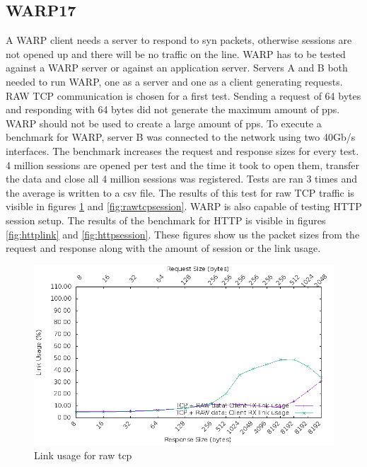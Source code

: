 \newpage

\subsection{WARP17}
A WARP client needs a server to respond to syn packets, otherwise sessions are not opened up and there will be no traffic on the line. 
WARP has to be tested against a WARP server or against an application server. 
Servers A and B both needed to run WARP, one as a server and one as a client generating requests. RAW TCP communication is chosen for a first test. Sending a request of 64 bytes and responding with 64 bytes did not generate the maximum amount of pps. WARP should not be used to create a large amount of pps. 
To execute a benchmark for WARP, server B was connected to the network using two 40Gb/s interfaces. 
The benchmark increases the request and response sizes for every test. 4 million sessions are opened per test and the time it took to open them, transfer the data and close all 4 million sessions was registered. Tests are ran 3 times and the average is written to a csv file. 
The results of this test for raw TCP traffic is visible in figures \ref{fig:rawtcplink} and \ref{fig:rawtcpsession}. 
WARP is also capable of testing HTTP session setup. The results of the benchmark for HTTP is visible in figures \ref{fig:httplink} and \ref{fig:httpsession}.
These figures show us the packet sizes from the request and response along with the amount of session or the link usage.

\begin{figure}[H]
  \includegraphics[scale=0.6]{images/raw_link_usage.png}
  \caption{Link usage for raw tcp}
  \label{fig:rawtcplink}
\end{figure}

